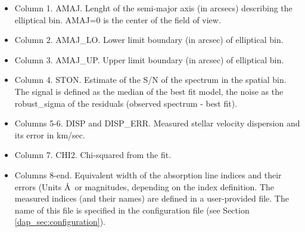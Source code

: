 \begin{itemize}

\item Column 1. AMAJ. Lenght of the semi-major axis (in arcsecs) describing the elliptical bin. AMAJ=0 is the center of the field of view.
\item Column 2. AMAJ\_LO. Lower limit boundary (in arcsec) of elliptical bin.
\item Column 3. AMAJ\_UP. Upper limit boundary (in arcsec) of elliptical bin.
\item Column 4. STON. Estimate of the S/N of the spectrum in the
  spatial bin. The signal is defined as the median of the best fit
  model, the noise as the robust\_sigma of the residuals (observed
  spectrum - best fit).
\item Columns 5-6.  DISP and DISP\_ERR. Measured stellar velocity dispersion and its error in km/sec.
\item Column 7.  CHI2. Chi-squared from the fit.
\item Columns 8-end. Equivalent width of the absorption line indices
  and their errors (Units \AA\ or magnitudes, depending on the index
  definition. The measured indices (and their names) are defined in a
  user-provided file. The name of this file is specified in the
  configuration file (see Section \ref{dap_sec:configuration}).
\end{itemize}

